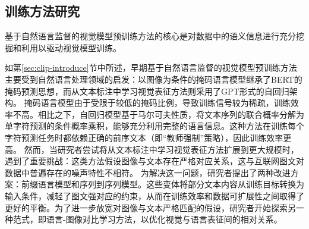 

\subsection{训练方法研究} %
基于自然语言监督的视觉模型预训练方法的核心是对数据中的语义信息进行充分挖掘和利用以驱动视觉模型训练。

如第\ref{sec:clip-introduce}节中所述，早期基于自然语言监督的视觉模型预训练方法主要受到自然语言处理领域的启发：以图像为条件的掩码语言模型\cite{sariyildiz2020learning}继承了BERT\cite{BERT}的掩码预测思想，而从文本标注中学习视觉表征方法\cite{desai2021virtex}则采用了GPT\cite{gpt2}形式的自回归架构。
掩码语言模型由于受限于较低的掩码比例，导致训练信号较为稀疏，训练效率不高。相比之下，自回归模型基于马尔可夫性质，将文本序列的联合概率分解为单字符预测的条件概率乘积，能够充分利用完整的语言信息。这种方法在训练每个字符预测任务时都依赖正确的前序文本（即“教师强制”策略），因此训练效率更高。
然而，当研究者尝试将从文本标注中学习视觉表征方法扩展到更大规模时，遇到了重要挑战：这类方法假设图像与文本存在严格对应关系，这与互联网图文对数据中普遍存在的噪声特性不相符。
为解决这一问题，研究者提出了两种改进方案：前缀语言模型\cite{SimVLM}和序列到序列模型\cite{GIT}。这些变体将部分文本内容从训练目标转换为输入条件，减轻了图文强对应的约束，从而在训练效率和数据可扩展性之间取得了更好的平衡。为了进一步放宽对图像与文本严格匹配的假设，研究者开始探索另一种范式，即语言-图像对比学习方法，以优化视觉与语言表征间的相对关系。

